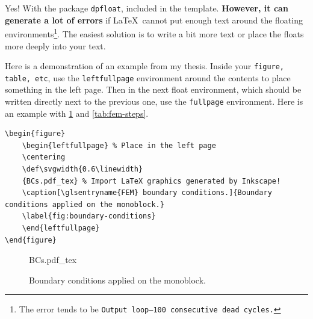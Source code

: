 Yes! With the package \verb|dpfloat|, included in the template. \textbf{However, it can generate a lot of errors} if \LaTeX\ cannot put enough text around the floating environments\footnote{The error tends to be \texttt{Output loop---100 consecutive dead cycles.}}. The easiest solution is to write a bit more text or place the floats more deeply into your text.

Here is a demonstration of an example from my thesis. Inside your \texttt{figure, table, etc}, use the \verb|leftfullpage| environment around the contents to place something in the left page. Then in the next float environment, which should be written directly next to the previous one, use the \verb|fullpage| environment. Here is an example with \cref{fig:boundary-conditions} and \cref{tab:fem-steps}.

\begin{lstlisting}[language={[LaTeX]TeX}]
\begin{figure}
	\begin{leftfullpage} % Place in the left page
	\centering
	\def\svgwidth{0.6\linewidth}
	{BCs.pdf_tex} % Import LaTeX graphics generated by Inkscape!
	\caption[\glsentryname{FEM} boundary conditions.]{Boundary conditions applied on the monoblock.}
	\label{fig:boundary-conditions}
	\end{leftfullpage}
\end{figure}
\end{lstlisting}

\begin{figure}
	\begin{leftfullpage} %
	\centering
	\def\svgwidth{0.6\linewidth}
	{BCs.pdf_tex} %
	\caption[ boundary conditions.]{Boundary conditions applied on the monoblock.}
	\label{fig:boundary-conditions}
	\end{leftfullpage}
\end{figure}

